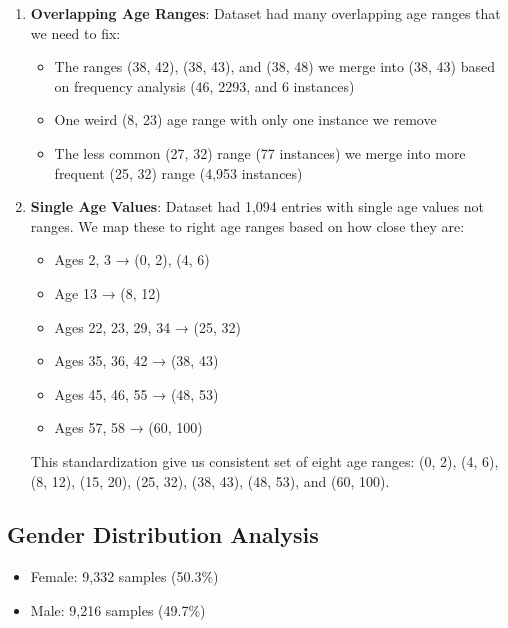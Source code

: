 \documentclass{article}
\begin{document}
\begin{enumerate}
    \item \textbf{Overlapping Age Ranges}: Dataset had many overlapping age ranges that we need to fix:
    \begin{itemize}
        \item The ranges (38, 42), (38, 43), and (38, 48) we merge into (38, 43) based on frequency analysis (46, 2293, and 6 instances)
        \item One weird (8, 23) age range with only one instance we remove
        \item The less common (27, 32) range (77 instances) we merge into more frequent (25, 32) range (4,953 instances)
    \end{itemize}
    
    \item \textbf{Single Age Values}: Dataset had 1,094 entries with single age values not ranges. We map these to right age ranges based on how close they are:
    \begin{itemize}
        \item Ages 2, 3 → (0, 2), (4, 6)
        \item Age 13 → (8, 12)
        \item Ages 22, 23, 29, 34 → (25, 32)
        \item Ages 35, 36, 42 → (38, 43)
        \item Ages 45, 46, 55 → (48, 53)
        \item Ages 57, 58 → (60, 100)
    \end{itemize}
    
    This standardization give us consistent set of eight age ranges: (0, 2), (4, 6), (8, 12), (15, 20), (25, 32), (38, 43), (48, 53), and (60, 100).
\end{enumerate}

\subsection{Gender Distribution Analysis}
\begin{itemize}
    \item Female: 9,332 samples (50.3\%)
    \item Male: 9,216 samples (49.7\%)
\end{itemize}
\end{document}
